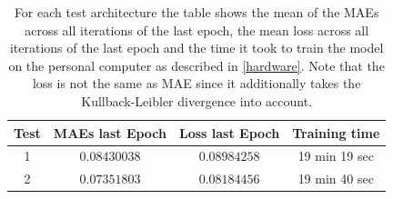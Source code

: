 \begin{center}
    \begin{table}[H]
        \centering
        \begin{tabular}{ | c | c | c | c | }
            \hline
            Test &MAEs last Epoch & Loss last Epoch & Training time\\ \hline
            1 & $0.08430038$  & $0.08984258$  & 19 min 19 sec  \\  
            2 & $0.07351803$  & $0.08184456$  & 19 min 40 sec  \\  
            \hline
        \end{tabular} 
        \caption{For each test architecture the table shows the mean of the MAEs across all iterations of the last
        epoch, the mean loss across all iterations of the last epoch and the time it took to train the model
        on the personal computer as described in \autoref{hardware}. Note that the loss is not the same
        as MAE since it additionally takes the Kullback-Leibler divergence into account.} \label{table_maes3}
    \end{table} 
\end{center}

